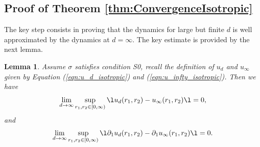 \documentclass[11pt]{article}
\newtheorem{lemma}{Lemma}
\begin{document}
\subsection{Proof of Theorem \ref{thm:ConvergenceIsotropic}}

The key step consists in proving that the dynamics for large but finite $d$ is
well approximated by the dynamics at $d=\infty$. The key estimate is provided by the next lemma.

\begin{lemma}\label{lem:perturbation_bound_isotropic_dynamics}
Assume $\sigma$ satisfies condition {\sf S0}, recall the definition of $u_d$ and $u_\infty$ given by Equation (\ref{eqn:u_d_isotropic}) and (\ref{eqn:u_infty_isotropic}). Then we have
\[
\lim_{d \rightarrow \infty} \sup_{r_1, r_2 \in [0, \infty)} \l u_d(r_1, r_2) - u_\infty(r_1, r_2) \l = 0,
\]
and
\[
\lim_{d \rightarrow \infty} \sup_{r_1, r_2 \in [0, \infty)} \l \partial_1 u_d(r_1, r_2) - \partial_1 u_\infty(r_1, r_2) \l = 0.
\]
\end{lemma}
\end{document}
